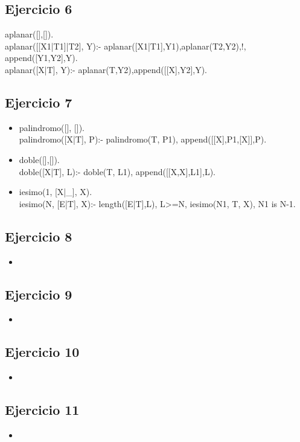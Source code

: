 \documentclass[10pt,a4paper]{article}
\begin{document}
\subsection{Ejercicio 6}
aplanar([],[]). \\
aplanar([[X1|T1]|T2], Y):- aplanar([X1|T1],Y1),aplanar(T2,Y2),!, append([Y1,Y2],Y). \\
aplanar([X|T], Y):- aplanar(T,Y2),append([[X],Y2],Y).

\subsection{Ejercicio 7}
\begin{itemize}
\item 
palindromo([], []). \\
palindromo([X|T], P):- palindromo(T, P1), append([[X],P1,[X]],P).
\item 
doble([],[]). \\
doble([X|T], L):- doble(T, L1), append([[X,X],L1],L).
\item 
iesimo(1, [X|_], X). \\
iesimo(N, [E|T], X):- length([E|T],L), L>=N, iesimo(N1, T, X), N1 is N-1.
\end{itemize}

\subsection{Ejercicio 8}
\begin{itemize}
\item
\end{itemize}

\subsection{Ejercicio 9}
\begin{itemize}
\item
\end{itemize}

\subsection{Ejercicio 10}
\begin{itemize}
\item
\end{itemize}

\subsection{Ejercicio 11}
\begin{itemize}
\item
\end{itemize}
\end{document}
